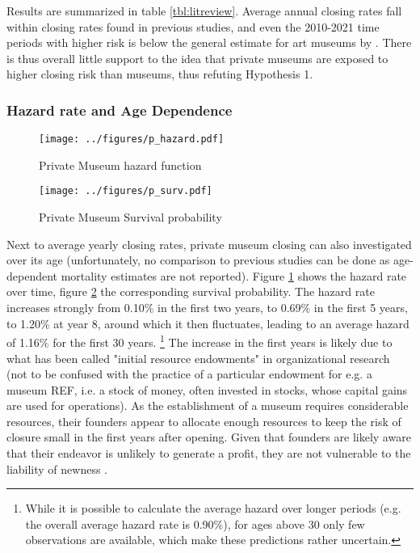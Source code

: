\documentclass[12pt]{article}
\begin{document}
Results are summarized in table \ref{tbl:litreview}.
Average annual closing rates fall within closing rates found in previous studies, and even the 2010-2021 time periods with higher risk is below the general estimate for art museums by \textcite{Hager_2001_vulnerability}.
There is thus overall little support to the idea that private museums are exposed to higher closing risk than museums, thus refuting Hypothesis 1.
\subsubsection*{Hazard rate and Age Dependence}


\begin{figure}[htbp]
\centering
\texttt{[image: ../figures/p\_hazard.pdf]}
\caption{\label{fig:p_hazard}Private Museum hazard function}
\end{figure}

\begin{figure}[htbp]
\centering
\texttt{[image: ../figures/p\_surv.pdf]}
\caption{\label{fig:p_surv}Private Museum Survival probability}
\end{figure}


Next to average yearly closing rates, private museum closing can also investigated over its age (unfortunately, no comparison to previous studies can be done as age-dependent mortality estimates are not reported).
Figure \ref{fig:p_hazard} shows the hazard rate over time, figure \ref{fig:p_surv} the corresponding survival probability.
The hazard rate increases strongly from 0.10\% in the first two years, to 0.69\% in the first 5 years, to 1.20\% at year 8, around which it then fluctuates, leading to an average hazard of 1.16\% for the first 30 years. \footnote{While it is possible to calculate the average hazard over longer periods (e.g. the overall average hazard rate is 0.90\%), for ages above 30 only few observations are available, which make these predictions rather uncertain.}
The increase in the first years is likely due to what has been called "initial resource endowments" in organizational research \cite{Carroll_Khessina_2019_demography,Hannan_1998_mortality} (not to be confused with the practice of a particular endowment for e.g. a museum REF, i.e. a stock of money, often invested in stocks, whose capital gains are used for operations).
As the establishment of a museum requires considerable resources, their founders appear to allocate enough resources to keep the risk of closure small in the first years after opening.
Given that founders are likely aware that their endeavor is unlikely to generate a profit, they are not vulnerable to the liability of newness \parencite{Stinchcombe_1965_structure}.
\end{document}
